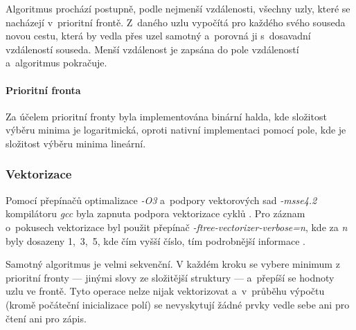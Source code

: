 Algoritmus prochází postupně, podle nejmenší vzdálenosti, všechny uzly, které se nacházejí v~prioritní frontě. Z~daného uzlu vypočítá pro každého svého souseda novou cestu, která by vedla přes uzel samotný a~porovná ji s~dosavadní vzdáleností souseda. Menší vzdálenost je zapsána do pole vzdáleností a~algoritmus pokračuje.

\paragraph{Prioritní fronta} \label{l:dij:fron}
Za účelem prioritní fronty byla implementována binární halda, kde složitost výběru minima je logaritmická, oproti nativní implementaci pomocí pole, kde je složitost výběru minima lineární.


\subsubsection{Vektorizace}
Pomocí přepínačů optimalizace \textit{-O3} a~podpory vektorových sad \textit{-msse4.2} kompilátoru \textit{gcc} byla zapnuta podpora vektorizace cyklů \cite{w:vect}. Pro záznam o~pokusech vektorizace byl použit přepínač \textit{-ftree-vectorizer-verbose=n}, kde za \textit{n} byly dosazeny 1,~3,~5, kde čím vyšší číslo, tím podrobnější informace \cite{w:vect}.\textbf{}

Samotný algoritmus je velmi sekvenční. V každém kroku se vybere minimum z prioritní fronty --- jinými slovy ze složitější struktury --- a~přepíší se hodnoty uzlu ve frontě. Tyto operace nelze nijak vektorizovat a~v~průběhu výpočtu (kromě počáteční inicializace polí) se nevyskytují žádné prvky vedle sebe ani pro čtení ani pro zápis.

